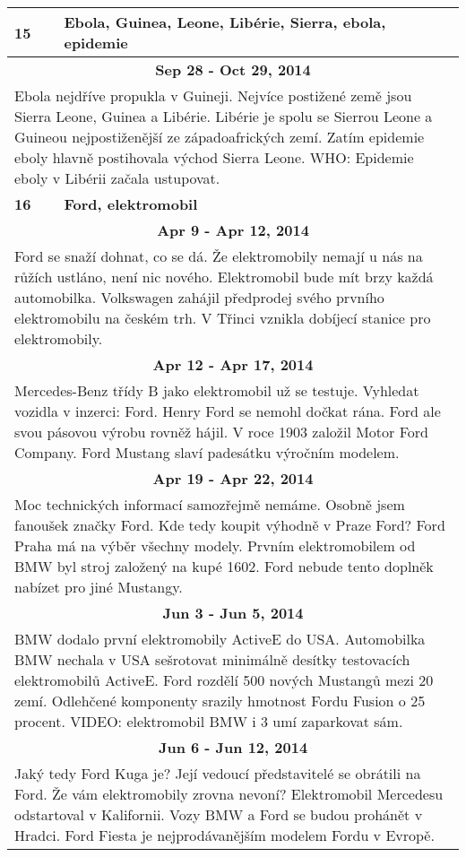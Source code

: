 \begin{tabularx}{\linewidth}{l l}
\bf 15 & \bf Ebola, Guinea, Leone, Libérie, Sierra, ebola, epidemie \\ \midrule
\multicolumn{2}{c}{\bf Sep 28 - Oct 29, 2014} \\
\multicolumn{2}{p{\linewidth}}{Ebola nejdříve propukla v Guineji. Nejvíce postižené země jsou Sierra Leone, Guinea a Libérie. Libérie je spolu se Sierrou Leone a Guineou nejpostiženější ze západoafrických zemí. Zatím epidemie eboly hlavně postihovala východ Sierra Leone. WHO: Epidemie eboly v Libérii začala ustupovat.} \\ \midrule[1.5pt]

\bf 16 & \bf Ford, elektromobil \\ \midrule
\multicolumn{2}{c}{\bf Apr 9 - Apr 12, 2014} \\
\multicolumn{2}{p{\linewidth}}{Ford se snaží dohnat, co se dá. Že elektromobily nemají u nás na růžích ustláno, není nic nového. Elektromobil bude mít brzy každá automobilka. Volkswagen zahájil předprodej svého prvního elektromobilu na českém trh. V Třinci vznikla dobíjecí stanice pro elektromobily.} \\ \midrule
\multicolumn{2}{c}{\bf Apr 12 - Apr 17, 2014} \\
\multicolumn{2}{p{\linewidth}}{Mercedes-Benz třídy B jako elektromobil už se testuje. Vyhledat vozidla v inzerci: Ford. Henry Ford se nemohl dočkat rána. Ford ale svou pásovou výrobu rovněž hájil. V roce 1903 založil Motor Ford Company. Ford Mustang slaví padesátku výročním modelem.} \\ \midrule
\multicolumn{2}{c}{\bf Apr 19 - Apr 22, 2014} \\
\multicolumn{2}{p{\linewidth}}{Moc technických informací samozřejmě nemáme. Osobně jsem fanoušek značky Ford. Kde tedy koupit výhodně v Praze Ford? Ford Praha má na výběr všechny modely. Prvním elektromobilem od BMW byl stroj založený na kupé 1602. Ford nebude tento doplněk nabízet pro jiné Mustangy.} \\ \midrule
\multicolumn{2}{c}{\bf Jun 3 - Jun 5, 2014} \\
\multicolumn{2}{p{\linewidth}}{BMW dodalo první elektromobily ActiveE do USA. Automobilka BMW nechala v USA sešrotovat minimálně desítky testovacích elektromobilů ActiveE. Ford rozdělí 500 nových Mustangů mezi 20 zemí. Odlehčené komponenty srazily hmotnost Fordu Fusion o 25 procent. VIDEO: elektromobil BMW i 3 umí zaparkovat sám.} \\ \midrule
\multicolumn{2}{c}{\bf Jun 6 - Jun 12, 2014} \\
\multicolumn{2}{p{\linewidth}}{Jaký tedy Ford Kuga je? Její vedoucí představitelé se obrátili na Ford. Že vám elektromobily zrovna nevoní? Elektromobil Mercedesu odstartoval v Kalifornii. Vozy BMW a Ford se budou prohánět v Hradci. Ford Fiesta je nejprodávanějším modelem Fordu v Evropě.} \\ \midrule

\end{tabularx}
